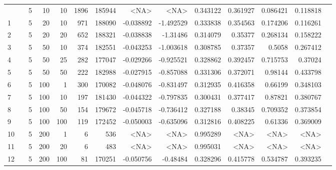 \begin{longtable}{llrrrrrrrrrrrr}
	\bottomrule
	\endlastfoot
		0   & \multirow[t]{84}{*}{\rotatebox[origin=r]{90}{sbert-default}} &            5 &                10 &           10 &        1896 &     185944 &      <NA> &      <NA> &  0.343122 &    0.361927 &       0.086421 &  0.118818 \\
		1   & &            5 &                20 &           10 &         971 &     188090 & -0.038892 & -1.492529 &  0.333838 &    0.354563 &       0.174206 &  0.116261 \\
		2   & &            5 &                20 &           20 &         652 &     188321 & -0.038838 &  -1.31486 &  0.314079 &     0.35377 &       0.268134 &  0.158222 \\
		3   & &            5 &                50 &           10 &         374 &     182551 & -0.043253 & -1.003618 &  0.308785 &     0.37357 &         0.5058 &  0.267412 \\
		4   & &            5 &                50 &           25 &         282 &     177047 & -0.029266 & -0.925521 &  0.328862 &    0.392457 &       0.715753 &   0.37024 \\
		5   & &            5 &                50 &           50 &         222 &     182988 & -0.027915 & -0.857088 &  0.331306 &    0.372071 &        0.98144 &  0.433798 \\
		6   & &            5 &               100 &            1 &         300 &     170082 & -0.048076 & -0.831497 &  0.312935 &    0.416358 &        0.66199 &  0.348103 \\
		7   & &            5 &               100 &           10 &         197 &     181430 & -0.044322 & -0.797835 &  0.300431 &    0.377417 &        0.87821 &  0.380767 \\
		8   & &            5 &               100 &           50 &         154 &     179672 & -0.045718 & -0.736412 &  0.327188 &     0.38345 &       0.709352 &  0.373854 \\
		9   & &            5 &               100 &          100 &         119 &     172452 & -0.050003 & -0.635096 &  0.312816 &    0.408225 &        0.61336 &  0.369009 \\
		10  & &            5 &               200 &            1 &              6 &        536 &      <NA> &      <NA> &  0.995289 &        <NA> &           <NA> &      <NA> \\
		11  & &            5 &               200 &           20 &              6 &        483 &      <NA> &      <NA> &  0.995031 &        <NA> &           <NA> &      <NA> \\
		12  & &            5 &               200 &          100 &          81 &     170251 & -0.050756 &  -0.48484 &  0.328296 &    0.415778 &       0.534787 &  0.393235 \\

\end{longtable}
